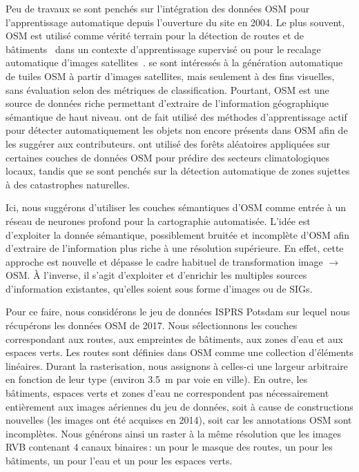 Peu de travaux se sont penchés sur l'intégration des données \gls{OSM} pour l'apprentissage automatique depuis l'ouverture du site en 2004. Le plus souvent, \gls{OSM} est utilisé comme vérité terrain pour la détection de routes et de bâtiments~\cite{mnih_machine_2013,maggiori_learning_2017} dans un contexte d'apprentissage supervisé ou pour le recalage automatique d'images satellites~\cite{vakalopoulou_simultaneous_2016}. \citet{isola_image--image_2017} se sont intéressés à la génération automatique de tuiles \gls{OSM} à partir d'images satellites, mais seulement à des fins visuelles, sans évaluation selon des métriques de classification. Pourtant, \gls{OSM} est une source de données riche permettant d'extraire de l'information géographique sémantique de haut niveau.
\citet{chen_deepvgi_2017} ont de fait utilisé des méthodes d'apprentissage actif pour détecter automatiquement les objets non encore présents dans \gls{OSM} afin de les suggérer aux contributeurs. \citet{danylo_contributing_2016} ont utilisé des forêts aléatoires appliquées sur certaines couches de données \gls{OSM} pour prédire des secteurs climatologiques locaux, tandis que \citet{geis_joint_2017} se sont penchés sur la détection automatique de zones sujettes à des catastrophes naturelles.

Ici, nous suggérons d'utiliser les couches sémantiques d'\gls{OSM} comme entrée à un réseau de neurones profond pour la cartographie automatisée. L'idée est d'exploiter la donnée sémantique, possiblement bruitée et incomplète d'\gls{OSM} afin d'extraire de l'information plus riche à une résolution supérieure. En effet, cette approche est nouvelle et dépasse le cadre habituel de transformation image $\rightarrow$ \gls{OSM}. À l'inverse, il s'agit d'exploiter et d'enrichir les multiples sources d'information existantes, qu'elles soient sous forme d'images ou de \glspl{SIG}.

Pour ce faire, nous considérons le jeu de données \gls{ISPRS} Potsdam sur lequel nous récupérons les données \gls{OSM} de 2017. Nous sélectionnons les couches correspondant aux routes, aux empreintes de bâtiments, aux zones d'eau et aux espaces verts. Les routes sont définies dans \gls{OSM} comme une collection d'éléments linéaires. Durant la rasterisation, nous assignons à celles-ci une largeur arbitraire en fonction de leur type (environ \SI{3,5}{\meter} par voie en ville). En outre, les bâtiments, espaces verts et zones d'eau ne correspondent pas nécessairement entièrement aux images aériennes du jeu de données, soit à cause de constructions nouvelles (les images ont été acquises en 2014), soit car les annotations \gls{OSM} sont incomplètes. Nous générons ainsi un raster à la même résolution que les images \gls{RVB} contenant 4 canaux binaires\,: un pour le masque des routes, un pour les bâtiments, un pour l'eau et un pour les espaces verts.

